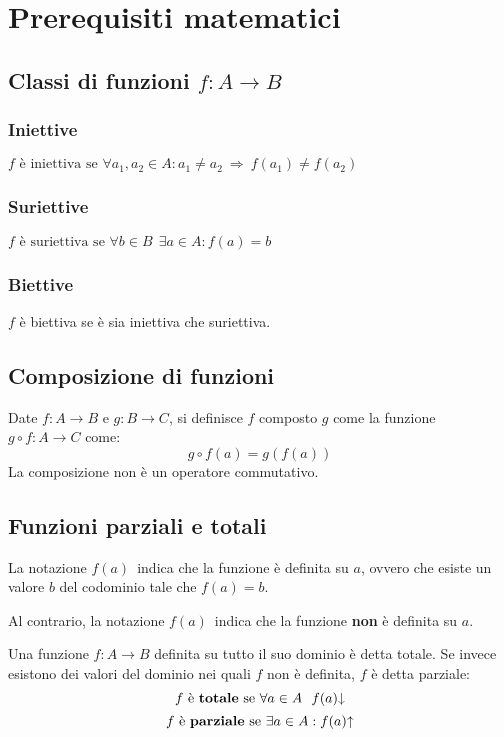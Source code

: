 
\section{Prerequisiti matematici}

\subsection*{Classi di funzioni $f:A\rightarrow B$}
\subsubsection*{Iniettive}
$ f \text{ è iniettiva se } \forall a_1,a_2 \in A: a_1\neq a_2 \
\Rightarrow \ f(a_1)\neq f(a_2) $
\subsubsection*{Suriettive}
$ f \text{ è suriettiva se } \forall b\in B \ \ \exists a\in A : f(a)=b $
\subsubsection*{Biettive}
$f$ è biettiva se è sia iniettiva che suriettiva.

\subsection*{Composizione di funzioni}
Date $f:A\rightarrow B$ e $g:B\rightarrow C$, si definisce $f$ composto $g$
come la funzione $g\circ f:A\rightarrow C$ come:
$$ g\circ f(a) = g(f(a)) $$
La composizione non è un operatore commutativo.

\subsection*{Funzioni parziali e totali}
La notazione $f(a)$\textdownarrow \ indica che la funzione è definita su $a$, ovvero
che esiste un valore $b$ del codominio tale che $f(a)=b$.

Al contrario, la notazione $f(a)$\textuparrow \ indica che la funzione \textbf{non} è
definita su $a$.

Una funzione $f:A\rightarrow B$ definita su tutto il suo dominio è detta totale. Se 
invece esistono dei valori del dominio nei quali $f$ non è definita, $f$ è detta 
parziale:
$$ f \text{ è \textbf{totale} se } \forall a\in A \ \ f(a)\text{\textdownarrow} $$
$$ f \text{ è \textbf{parziale} se } \exists a\in A : f(a)\text{\textuparrow} $$

